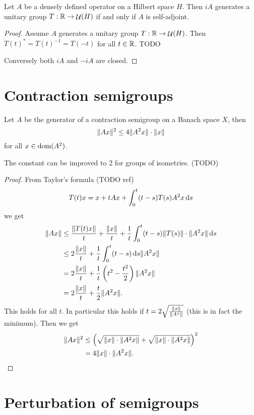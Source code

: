 \begin{theorem}
Let $A$ be a densely defined operator on a Hilbert space $H$. Then $iA$ generates a unitary group $T: \mathbb{R} \to \mathop{\mathcal{U}}\nolimits(H)$ \textup{if and only if} $A$ is self-adjoint.
\end{theorem}
\begin{proof}
Assume $A$ generates a unitary group $T: \mathbb{R} \to \mathop{\mathcal{U}}\nolimits(H)$. Then $T(t)^* = T(t)^{-1} = T(-t)$ for all $t\in \mathbb{R}$. TODO

Conversely both $iA$ and $-iA$ are closed.
\end{proof}

\section{Contraction semigroups}

\begin{proposition}
Let $A$ be the generator of a contraction semigroup on a Banach space $X$, then
\[ \lVert Ax\rVert^2 \leq 4 \lVert A^2x\rVert\cdot\lVert x\rVert \]
for all $x\in\operatorname{dom}(A^2)$.
\end{proposition}
The constant can be improved to 2 for groups of isometries. (TODO)
\begin{proof}
From Taylor's formula (TODO ref)
\[ T(t)x = x + tAx + \int_0^t(t-s)T(s)A^2x \operatorname{d \!}{s} \]
we get
\begin{align*}
\lVert Ax\rVert &\leq \frac{\lVert T(t)x\rVert}{t} + \frac{\lVert x\rVert}{t} + \frac{1}{t}\int_0^t(t-s)\lVert T(s)\rVert\cdot\lVert A^2x\rVert\operatorname{d \!}{s} \\
&\leq 2\frac{\lVert x\rVert}{t} + \frac{1}{t}\int_0^t(t-s)\operatorname{d \!}{s}\lVert A^2x\rVert \\
&= 2\frac{\lVert x\rVert}{t} + \frac{1}{t}\left(t^2 - \frac{t^2}{2}\right)\lVert A^2x\rVert \\
&= 2\frac{\lVert x\rVert}{t} + \frac{t}{2}\lVert A^2x\rVert.
\end{align*}
This holds for all $t$. In particular this holds if $t = 2\sqrt{\frac{\lVert x\rVert}{\lVert A^x\rVert}}$ (this is in fact the minimum). Then we get
\begin{align*}
\lVert Ax\rVert^2 &\leq \left(\sqrt{\lVert x\rVert\cdot\lVert A^2x\rVert} + \sqrt{\lVert x\rVert\cdot\lVert A^2x\rVert}\right)^2 \\
&= 4\lVert x\rVert\cdot\lVert A^2x\rVert.
\end{align*}
\end{proof}

\section{Perturbation of semigroups}

